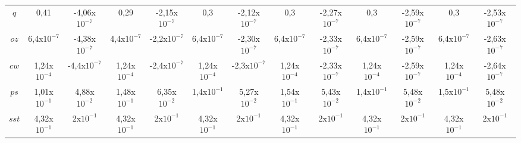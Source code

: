 \begin{table}[H]
\begin{center}
\begin{adjustbox}{max width=\textwidth}
\begin{tabular}{ccccccccccccc}
\multicolumn{1}{c}{$q$}    & \multicolumn{1}{c}{0,41} & \multicolumn{1}{c}{-4,06x$10^{-7}$} & \multicolumn{1}{c}{0,29} & \multicolumn{1}{c}{-2,15x$10^{-7}$} & \multicolumn{1}{c}{0,3} & \multicolumn{1}{c}{-2,12x$10^{-7}$} & \multicolumn{1}{c}{0,3} & \multicolumn{1}{c}{-2,27x$10^{-7}$} & \multicolumn{1}{c}{0,3} & \multicolumn{1}{c}{-2,59x$10^{-7}$} & \multicolumn{1}{c}{0,3} & \multicolumn{1}{c}{-2,53x$10^{-7}$} \\ 
\multicolumn{1}{c}{$oz$}  & \multicolumn{1}{c}{6,4x$10^{-7}$} & \multicolumn{1}{c}{-4,38x$10^{-7}$} & \multicolumn{1}{c}{4,4x$10^{-7}$} & \multicolumn{1}{c}{-2,2x$10^{-7}$} & \multicolumn{1}{c}{6,4x$10^{-7}$} & \multicolumn{1}{c}{-2,30x$10^{-7}$} & \multicolumn{1}{c}{6,4x$10^{-7}$} & \multicolumn{1}{c}{-2,33x$10^{-7}$} & \multicolumn{1}{c}{6,4x$10^{-7}$} & \multicolumn{1}{c}{-2,59x$10^{-7}$} & \multicolumn{1}{c}{6,4x$10^{-7}$} & \multicolumn{1}{c}{-2,63x$10^{-7}$} \\ 
\multicolumn{1}{c}{$cw$}  & \multicolumn{1}{c}{1,24x$10^{-4}$} & \multicolumn{1}{c}{-4,4x$10^{-7}$} & \multicolumn{1}{c}{1,24x$10^{-4}$} & \multicolumn{1}{c}{-2,4x$10^{-7}$} & \multicolumn{1}{c}{1,24x$10^{-4}$} & \multicolumn{1}{c}{-2,3x$10^{-7}$} & \multicolumn{1}{c}{1,24x$10^{-4}$} & \multicolumn{1}{c}{-2,33x$10^{-7}$} & \multicolumn{1}{c}{1,24x$10^{-4}$} & \multicolumn{1}{c}{-2,59x$10^{-7}$} & \multicolumn{1}{c}{1,24x$10^{-4}$} & \multicolumn{1}{c}{-2,64x$10^{-7}$} \\ 
\multicolumn{1}{c}{$ps$}   & \multicolumn{1}{c}{1,01x$10^{-1}$} & \multicolumn{1}{c}{4,88x$10^{-2}$} & \multicolumn{1}{c}{1,48x$10^{-1}$} & \multicolumn{1}{c}{6,35x$10^{-2}$} & \multicolumn{1}{c}{1,4x$10^{-1}$} & \multicolumn{1}{c}{5,27x$10^{-2}$} & \multicolumn{1}{c}{1,54x$10^{-1}$} & \multicolumn{1}{c}{5,43x$10^{-2}$} & \multicolumn{1}{c}{1,4x$10^{-1}$} & \multicolumn{1}{c}{5,48x$10^{-2}$} & \multicolumn{1}{c}{1,5x$10^{-1}$} & \multicolumn{1}{c}{5,48x$10^{-2}$} \\ 
\multicolumn{1}{c}{$sst$} & \multicolumn{1}{c}{4,32x$10^{-1}$} & \multicolumn{1}{c}{2x$10^{-1}$} & \multicolumn{1}{c}{4,32x$10^{-1}$} & \multicolumn{1}{c}{2x$10^{-1}$} & \multicolumn{1}{c}{4,32x$10^{-1}$} & \multicolumn{1}{c}{2x$10^{-1}$} & \multicolumn{1}{c}{4,32x$10^{-1}$} & \multicolumn{1}{c}{2x$10^{-1}$} & \multicolumn{1}{c}{4,32x$10^{-1}$} & \multicolumn{1}{c}{2x$10^{-1}$} & \multicolumn{1}{c}{4,32x$10^{-1}$} & \multicolumn{1}{c}{2x$10^{-1}$} \\ 
\bottomrule
\end{tabular}
\end{adjustbox}
\end{center}
\label{tab:amplimaxminB}
\end{table}

